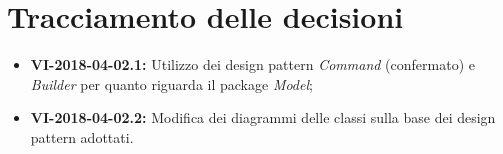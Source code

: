 \documentclass[openany,12pt,a4paper]{article}
\begin{document}
  \section{Tracciamento delle decisioni} 
   
  \begin{itemize} 
      \item \textbf{VI-2018-04-02.1:} Utilizzo dei design pattern \textit{Command} (confermato) e \textit{Builder} per quanto riguarda il package \textit{Model};
      \item \textbf{VI-2018-04-02.2:} Modifica dei diagrammi delle classi sulla base dei design pattern adottati.
  \end{itemize} 
   
  
\end{document}
